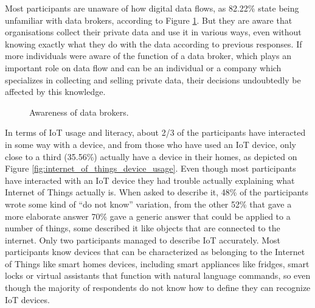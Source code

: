 Most participants are unaware of how digital data flows, as 82.22\% state
being unfamiliar with data brokers, according to Figure \ref{fig:aware_data_brokers}.
But they are aware that organisations collect their private data and use it
in various ways, even without knowing exactly what they do with the data
according to previous responses. If more individuals were aware of the function
of a data broker, which plays an important role on data flow and can be an individual
or a company which specializes in collecting and selling private data, their decisions
undoubtedly be affected by this knowledge.

\begin{figure}[H]
    \centering
    \caption{Awareness of data brokers.}
    \label{fig:aware_data_brokers}
\end{figure}

In terms of IoT usage and literacy, about 2/3 of the participants have interacted in
some way with a device, and from those who have used an IoT device, only close
to a third (35.56\%) actually have a device in their homes, as depicted on
Figure \ref{fig:internet_of_things_device_usage}. Even though most participants
have interacted with an IoT device they had trouble actually explaining what Internet
of Things actually is. When asked to describe it, 48\% of the participants
wrote some kind of ``do not know'' variation, from the other 52\% that gave
a more elaborate answer 70\% gave a generic answer that could be applied to
a number of things, some described it like objects that are connected
to the internet. Only two participants managed to describe IoT accurately.
Most participants know devices that can be characterized as belonging to
the Internet of Things like smart homes devices, including smart
appliances like fridges, smart locks or virtual assistants that
function with natural language commands, so even though the majority
of respondents do not know how to define they can recognize IoT devices.

